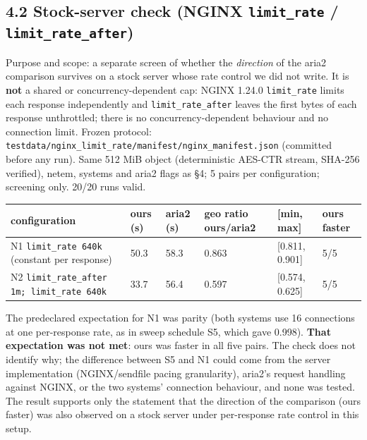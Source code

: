\documentclass{ieeeaccess}
\begin{document}
\subsection*{4.2 Stock-server check (NGINX \texttt{limit\_\allowbreak{}rate} / \texttt{limit\_\allowbreak{}rate\_\allowbreak{}after})}

Purpose and scope: a separate screen of whether the \emph{direction} of the aria2 comparison survives on a stock server whose rate control we did not write. It is \textbf{not} a shared or concurrency-dependent cap: NGINX 1.24.0 \texttt{limit\_\allowbreak{}rate} limits each response independently and \texttt{limit\_\allowbreak{}rate\_\allowbreak{}after} leaves the first bytes of each response unthrottled; there is no concurrency-dependent behaviour and no connection limit. Frozen protocol: \texttt{testdata/\allowbreak{}nginx\_limit\_rate/\allowbreak{}manifest/\allowbreak{}nginx\_manifest.json} (committed before any run). Same 512 MiB object (deterministic AES-CTR stream, SHA-256 verified), netem, systems and aria2 flags as §4; 5 pairs per configuration; screening only. 20/20 runs valid.


\begin{table}[!t]\centering\scriptsize
\begin{tabularx}{\textwidth}{@{}LLLLLL@{}}
\toprule
\textbf{configuration} & \textbf{ours (s)} & \textbf{aria2 (s)} & \textbf{geo ratio ours/aria2} & \textbf{[min, max]} & \textbf{ours faster}\\
\midrule
N1 \texttt{limit\_\allowbreak{}rate 640k} (constant per response) & 50.3 & 58.3 & 0.863 & [0.811, 0.901] & 5/5\\
N2 \texttt{limit\_\allowbreak{}rate\_\allowbreak{}after 1m; limit\_\allowbreak{}rate 640k} & 33.7 & 56.4 & 0.597 & [0.574, 0.625] & 5/5\\
\bottomrule
\end{tabularx}
\end{table}


The predeclared expectation for N1 was parity (both systems use 16 connections at one per-response rate, as in sweep schedule S5, which gave 0.998). \textbf{That expectation was not met}: ours was faster in all five pairs. The check does not identify why; the difference between S5 and N1 could come from the server implementation (NGINX/sendfile pacing granularity), aria2's request handling against NGINX, or the two systems' connection behaviour, and none was tested. The result supports only the statement that the direction of the comparison (ours faster) was also observed on a stock server under per-response rate control in this setup.
\end{document}
